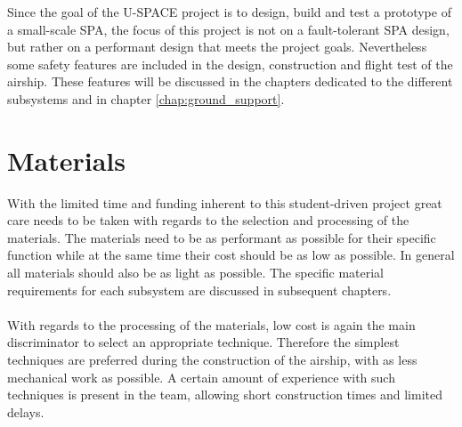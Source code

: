 Since the goal of the \ac{U-SPACE} project is to design, build and test a prototype of a small-scale \ac{SPA}, the focus of this project is not on a fault-tolerant \ac{SPA} design, but rather on a performant design that meets the project goals. Nevertheless some safety features are included in the design, construction and flight test of the airship. These features will be discussed in the chapters dedicated to the different subsystems and in chapter \ref{chap:ground_support}.

\section{Materials}

With the limited time and funding inherent to this student-driven project great care needs to be taken with regards to the selection and processing of the materials. The materials need to be as performant as possible for their specific function while at the same time their cost should be as low as possible. In general all materials should also be as light as possible. The specific material requirements for each subsystem are discussed in subsequent chapters.
\\
\\
With regards to the processing of the materials, low cost is again the main discriminator to select an appropriate technique. Therefore the simplest techniques are preferred during the construction of the airship, with as less mechanical work as possible. A certain amount of experience with such techniques is present in the team, allowing short construction times and limited delays.